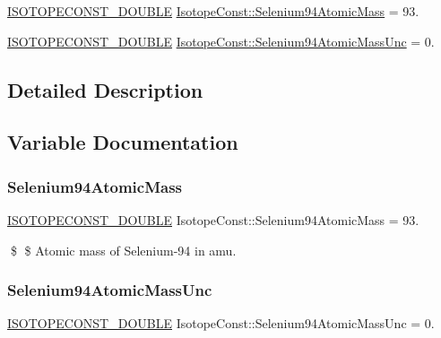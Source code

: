 \begin{DoxyCompactItemize}
\item 
\mbox{\hyperlink{group___isotope_const-_macros_ga8f45a7272ce02c0b4c65c44636ed719a}{I\+S\+O\+T\+O\+P\+E\+C\+O\+N\+S\+T\+\_\+\+D\+O\+U\+B\+LE}} \mbox{\hyperlink{group___isotope_const-_selenium-_se94_ga403b550b7d07a4e72f514b954d108683}{Isotope\+Const\+::\+Selenium94\+Atomic\+Mass}} = 93.
\item 
\mbox{\hyperlink{group___isotope_const-_macros_ga8f45a7272ce02c0b4c65c44636ed719a}{I\+S\+O\+T\+O\+P\+E\+C\+O\+N\+S\+T\+\_\+\+D\+O\+U\+B\+LE}} \mbox{\hyperlink{group___isotope_const-_selenium-_se94_ga4013370584b759c68f486314cbf36866}{Isotope\+Const\+::\+Selenium94\+Atomic\+Mass\+Unc}} = 0.
\end{DoxyCompactItemize}


\subsection{Detailed Description}


\subsection{Variable Documentation}
\mbox{\label{group___isotope_const-_selenium-_se94_ga403b550b7d07a4e72f514b954d108683}} 
\subsubsection{\texorpdfstring{Selenium94\+Atomic\+Mass}{Selenium94AtomicMass}}
{\footnotesize\ttfamily \mbox{\hyperlink{group___isotope_const-_macros_ga8f45a7272ce02c0b4c65c44636ed719a}{I\+S\+O\+T\+O\+P\+E\+C\+O\+N\+S\+T\+\_\+\+D\+O\+U\+B\+LE}} Isotope\+Const\+::\+Selenium94\+Atomic\+Mass = 93.}

\$ \$ Atomic mass of Selenium-\/94 in amu. \mbox{\label{group___isotope_const-_selenium-_se94_ga4013370584b759c68f486314cbf36866}} 
\subsubsection{\texorpdfstring{Selenium94\+Atomic\+Mass\+Unc}{Selenium94AtomicMassUnc}}
{\footnotesize\ttfamily \mbox{\hyperlink{group___isotope_const-_macros_ga8f45a7272ce02c0b4c65c44636ed719a}{I\+S\+O\+T\+O\+P\+E\+C\+O\+N\+S\+T\+\_\+\+D\+O\+U\+B\+LE}} Isotope\+Const\+::\+Selenium94\+Atomic\+Mass\+Unc = 0.}


